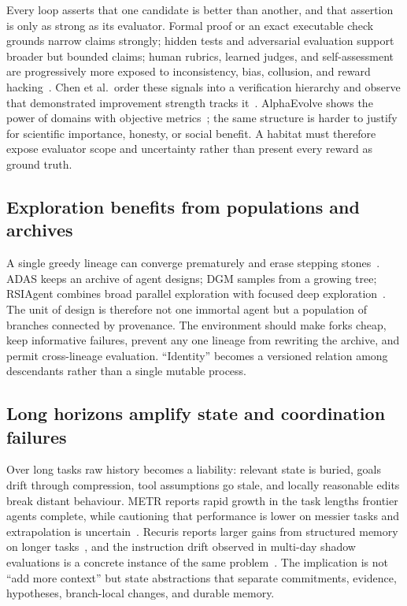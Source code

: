 \documentclass[11pt,a4paper]{article}
\begin{document}
Every loop asserts that one candidate is better than another, and that assertion is only as strong as its evaluator. Formal proof or an exact executable check grounds narrow claims strongly; hidden tests and adversarial evaluation support broader but bounded claims; human rubrics, learned judges, and self-assessment are progressively more exposed to inconsistency, bias, collusion, and reward hacking~\cite{rewardhacking,subterfuge}. Chen et al.\ order these signals into a verification hierarchy and observe that demonstrated improvement strength tracks it~\cite{chen-survey}. AlphaEvolve shows the power of domains with objective metrics~\cite{alphaevolve}; the same structure is harder to justify for scientific importance, honesty, or social benefit. A habitat must therefore expose evaluator scope and uncertainty rather than present every reward as ground truth.

\subsection{Exploration benefits from populations and archives}

A single greedy lineage can converge prematurely and erase stepping stones~\cite{novelty}. ADAS keeps an archive of agent designs; DGM samples from a growing tree; RSIAgent combines broad parallel exploration with focused deep exploration~\cite{adas,dgm,rsiagent}. The unit of design is therefore not one immortal agent but a population of branches connected by provenance. The environment should make forks cheap, keep informative failures, prevent any one lineage from rewriting the archive, and permit cross-lineage evaluation. ``Identity'' becomes a versioned relation among descendants rather than a single mutable process.

\subsection{Long horizons amplify state and coordination failures}

Over long tasks raw history becomes a liability: relevant state is buried, goals drift through compression, tool assumptions go stale, and locally reasonable edits break distant behaviour. METR reports rapid growth in the task lengths frontier agents complete, while cautioning that performance is lower on messier tasks and extrapolation is uncertain~\cite{metr-horizon}. Recuris reports larger gains from structured memory on longer tasks~\cite{recuris}, and the instruction drift observed in multi-day shadow evaluations is a concrete instance of the same problem~\cite{shadow}. The implication is not ``add more context'' but state abstractions that separate commitments, evidence, hypotheses, branch-local changes, and durable memory.
\end{document}
